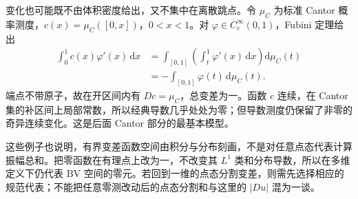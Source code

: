 \ProseParagraphBreak

变化也可能既不由体积密度给出，又不集中在离散跳点。令 \(\mu_C\) 为标准 Cantor 概率测度，\(c(x)=\mu_C([0,x])\)，\(0<x<1\)。对 \(\varphi\in C_c^\infty(0,1)\)，Fubini 定理给出
\[
 \begin{aligned}
 \int_0^1c(x)\varphi'(x)\,\mathrm dx
 &=\int_{[0,1]}\left(\int_t^1\varphi'(x)\,\mathrm dx\right)
                                      \mathrm d\mu_C(t)\\
 &=-\int_{[0,1]}\varphi(t)\,\mathrm d\mu_C(t).
 \end{aligned}
\]
端点不带原子，故在开区间内有 \(Dc=\mu_C\)，总变差为一。函数 \(c\) 连续，在 Cantor 集的补区间上局部常数，所以经典导数几乎处处为零；但导数测度仍保留了非零的奇异连续变化。这是后面 Cantor 部分的最基本模型。

\ProseParagraphBreak

这些例子也说明，有界变差函数空间由积分与分布刻画，不是对任意点态代表计算振幅总和。把零函数在有理点上改为一，不改变其 \(L^1\) 类和分布导数，所以在多维定义下仍代表 \(\mathrm{BV}\) 空间的零元。若回到一维的点态分割变差，则需先选择相应的规范代表；不能把任意零测改动后的点态分割和与这里的 \(|Du|\) 混为一谈。
